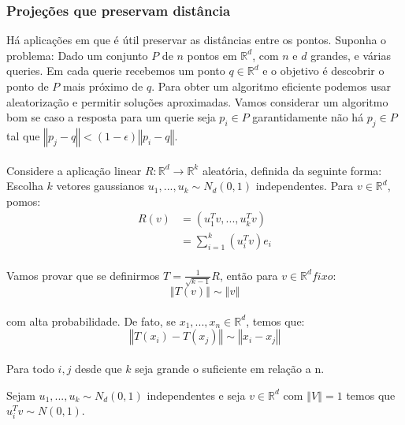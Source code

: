 \subsubsection{Projeções que preservam distância} Há aplicações em que é útil preservar as distâncias entre os pontos. Suponha o problema: Dado um conjunto $P$ de $n$ pontos em $\mathbb{R}^d$, com $n$ e $d$ grandes, e várias queries. Em cada querie recebemos um ponto $q \in \mathbb{R}^d$ e o objetivo é descobrir o ponto de $P$ mais próximo de $q$. Para obter um algoritmo eficiente podemos usar aleatorização e permitir soluções aproximadas. Vamos considerar um algoritmo bom se caso a resposta para um querie seja $p_i \in P$ garantidamente não há $p_j \in P$ tal que $\left\Vert p_j - q \right\Vert <(1 - \epsilon) \left\Vert p_i - q \right\Vert$. 

\paragraph{}Considere a aplicação linear $R \colon \mathbb{R}^d \to \mathbb{R}^k$ aleatória, definida da seguinte forma: Escolha $k$ vetores gaussianos $u_1,...,u_k \sim N_d(0,1)$ independentes. Para $v \in \mathbb{R}^d$, pomos:
\begin{equation*}
    \begin{split}
    R(v) &= (u_1^Tv,...,u_k^Tv)\\
         &= \sum\limits_{i=1}^k (u_i^Tv)e_i
    \end{split}
\end{equation*}
\paragraph{}Vamos provar que se definirmos $T = \frac{1}{\sqrt{k-1}}R$, então para $v \in \mathbb{R}^d fixo$:
\begin{equation*}
    \left\Vert T(v) \right\Vert \sim \left\Vert v \right\Vert
\end{equation*}
\paragraph{}com alta probabilidade. De fato, se $x_1,...,x_n\in \mathbb{R}^d$, temos que:
\begin{equation*}
    \left\Vert T(x_i) - T(x_j) \right\Vert \sim \left\Vert x_i - x_j \right\Vert
\end{equation*}
\paragraph{}Para todo $i,j$ desde que $k$ seja grande o suficiente em relação a n.
\begin{fato}
Sejam $u_1,...,u_k \sim N_d(0,1)$ independentes e seja $v \in \mathbb{R}^d$ com $\left\Vert V \right\Vert = 1$ temos que $u_i^Tv \sim N(0,1)$.
\end{fato}
